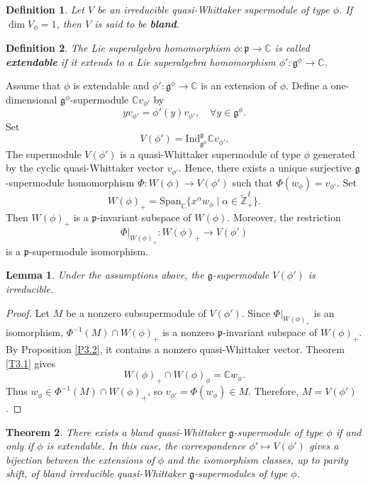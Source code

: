 \documentclass[12pt,reqno]{article}
\newtheorem{thm}{Theorem}[section]
\newtheorem{lem}[thm]{Lemma}
\newtheorem{Def}{Definition}[section]
\def\a{\alpha}
\def\F{\mathfrak}
\def\r{\mathrm}
\def\CC{\mathbb{C}}
\def\ZZ{\mathbb{Z}}
\def\beqn{\begin{equation*}}
\def\eeqn{\end{equation*}}
\begin{document}
\begin{Def}
Let $V$ be an irreducible quasi-Whittaker supermodule of type $\phi$. If $\dim V_\phi=1$, then $V$ is said to be {\bf bland}.	
\end{Def}

\begin{Def}
The Lie superalgebra homomorphism $\phi\colon\F{p}\rightarrow\CC$ is called {\bf extendable} if it extends to a Lie superalgebra homomorphism $\phi'\colon\F{g}^\phi\rightarrow\CC$.
\end{Def}

Assume that $\phi$ is extendable and $\phi'\colon \F{g}^\phi\rightarrow \CC$ is an extension of $\phi$. Define a one-dimensional $\F{g}^\phi$-supermodule $\CC v_{\phi'}$ by 
\beqn
yv_{\phi'}=\phi'(y)v_{\phi'},\quad \forall y\in\F{g}^\phi.
\eeqn
Set 
\beqn
V(\phi')=\r{Ind}_{\F{g}^\phi}^\F{g}\CC v_{\phi'}.
\eeqn 
The supermodule $V(\phi')$ is a quasi-Whittaker supermodule of type $\phi$ generated by the cyclic quasi-Whittaker vector $v_{\phi'}$. Hence, there exists a unique surjective $\F{g}$-supermodule homomorphism $\Phi\colon W(\phi)\rightarrow V(\phi')$ such that $\Phi(w_\phi)=v_{\phi'}$. Set
\beqn
W(\phi)_+=\r{Span}_\CC\{x^\a w_\phi\mid \a\in\widetilde{\ZZ}^I_+\}.
\eeqn
Then $W(\phi)_+$ is a $\F{p}$-invariant subspace of $W(\phi)$. Moreover, the restriction
\beqn
\Phi|_{W(\phi)_+}\colon W(\phi)_+\rightarrow V(\phi')
\eeqn
is a $\F{p}$-supermodule isomorphism.

\begin{lem}\label{L5}
	Under the assumptions above, the $\F{g}$-supermodule $V(\phi')$ is irreducible.
\end{lem}

\begin{proof}
Let $M$ be a nonzero subsupermodule of $V(\phi')$. Since $\Phi|_{W(\phi)_+}$ is an isomorphism, $\Phi^{-1}(M)\cap W(\phi)_+$ is a nonzero $\F{p}$-invariant subspace of $W(\phi)_+$. By Proposition \ref{P3.2}, it contains a nonzero quasi-Whittaker vector. Theorem \ref{T3.1} gives
\beqn
W(\phi)_+\cap W(\phi)_\phi=\CC w_\phi.
\eeqn
Thus $w_\phi\in\Phi^{-1}(M)\cap W(\phi)_+$, so $v_{\phi'}=\Phi(w_\phi)\in M$. Therefore, $M=V(\phi')$.
\end{proof}







\begin{thm}\label{T3.6}
There exists a bland quasi-Whittaker $\F{g}$-supermodule of type $\phi$ if and only if $\phi$ is extendable. In this case, the correspondence $\phi'\mapsto V(\phi')$ gives a bijection between the extensions of $\phi$ and the isomorphism classes, up to parity shift, of bland irreducible quasi-Whittaker $\F{g}$-supermodules of type $\phi$.
\end{thm}
\end{document}
